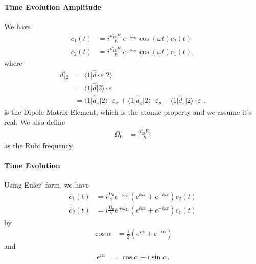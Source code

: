 \documentclass[../../note.tex]{subfiles}
\begin{document}
\paragraph{Time Evolution Amplitude}
We have
\begin{align}
    \dot{c_1}(t)
    &= i \frac{d^{\varepsilon}_{12} E_0}{\hbar} e^{- \omega_{21}} \cos(\omega t)c_2(t) \\
    \dot{c_2}(t)
    &= i \frac{d^{\varepsilon}_{12} E_0}{\hbar} e^{+ \omega_{21}} \cos(\omega t)c_1(t),
\end{align}
where 
\begin{align}
    d^{\varepsilon}_{12} 
    &= \langle 1 \vert \hat{d} \cdot \varepsilon \vert 2 \rangle \\
    &= \langle 1 \vert \hat{d} \vert 2 \rangle \cdot \varepsilon \\
    &= \langle 1 \vert \hat{d}_x \vert 2 \rangle \cdot \varepsilon_x +\langle 1 \vert \hat{d}_y \vert 2 \rangle \cdot \varepsilon_y + \langle 1 \vert \hat{d}_z \vert 2 \rangle \cdot \varepsilon_z.
\end{align}
is the Dipole Matrix Element, which is the atomic property and we assume it's real. We also define
\begin{align}
    \Omega_0
    &= \frac{d_{12}^{\varepsilon} E_0}{\hbar}
\end{align}
as the Rubi frequency.

\paragraph{Time Evolution}
Using Euler' form, we have
\begin{align}
    \dot{c_1}(t)
    &= i \frac{\Omega_0}{2} e^{- \omega_{21}} (e^{i \omega t} + e^{-i \omega t})c_2(t) \\
    \dot{c_2}(t)
    &= i \frac{\Omega_0}{2} e^{+ \omega_{21}} (e^{i \omega t} + e^{-i \omega t}) c_1(t)
\end{align}
by
\begin{align}
    \cos \alpha
    &= \frac{1}{2} (e^{i \alpha} + e^{-i \alpha})
\end{align}
and
\begin{align}
    e^{i \alpha}
    &= \cos \alpha + i \sin \alpha.
\end{align}
\end{document}
